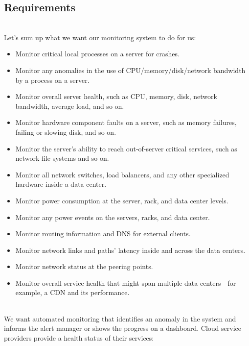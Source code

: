 

\subsection{Requirements}\label{vC-7faWFJGSRNhYEgDjD-}
\\
Let's sum up what we want our monitoring system to do for us:

\begin{itemize}
\item
\protect{}\label{0X6V1zVvkLr4SCAQrPxzI}
Monitor critical local processes on a server for crashes.
\item
\protect{}\label{ljpgdGrb1wVBI9uJwV_vi}
Monitor any anomalies in the use of CPU/memory/disk/network bandwidth by a process on a server.
\item
\protect{}\label{pzw8jucHMi1wggN8iCa7z}
Monitor overall server health, such as CPU, memory, disk, network bandwidth, average load, and so on.
\item
\protect{}\label{It9VTSiUON_sIcEUPvg3z}
Monitor hardware component faults on a server, such as memory failures, failing or slowing disk, and so on.
\item
\protect{}\label{Qcqazy6i_oCZeu_kP0ciQ}
Monitor the server's ability to reach out-of-server critical services, such as network file systems and so on.
\item
\protect{}\label{tBulU0MPHkfCCc06nqGCU}
Monitor all network switches, load balancers, and any other specialized hardware inside a data center.
\item
\protect{}\label{JxWPI8XeDHpmXm__Wpqd8}
Monitor power consumption at the server, rack, and data center levels.
\item
\protect{}\label{nGC5GTMWbCtxInor3-47D}
Monitor any power events on the servers, racks, and data center.
\item
\protect{}\label{gd5-ln66drN6b28nFF1SQ}
Monitor routing information and DNS for external clients.
\item
\protect{}\label{ihTkXGEXaNLglrhnUFT4K}
Monitor network links and paths' latency inside and across the data centers.
\item
\protect{}\label{mVVJHNL62n6bf5c-p09Av}
Monitor network status at the peering points.
\item
\protect{}\label{Xha4fi34bnm6ILtOfKi4h}
Monitor overall service health that might span multiple data centers---for example, a CDN and its performance.
\end{itemize}
\\
We want automated monitoring that identifies an anomaly in the system and informs the alert manager or shows the progress on a dashboard. Cloud service providers provide a health status of their services:

